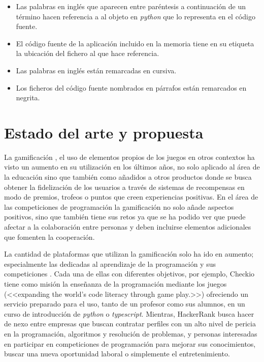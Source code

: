 \documentclass[11pt,spanish,listoffigures,listoftables]{tfgetsinf}
\begin{document}
\begin{itemize}
	\item Las palabras en inglés que aparecen entre paréntesis a continuación de un término hacen referencia a al objeto en \textit{python} que lo representa en el código fuente.
	\item El código fuente de la aplicación incluido en la memoria tiene en su etiqueta la ubicación del fichero al que hace referencia.
	\item Las palabras en inglés están remarcadas en cursiva.
	\item Los ficheros del código fuente nombrados en párrafos están remarcados en negrita.
\end{itemize}

\chapter{Estado del arte y propuesta}

La gamificación \cite{article-defining-gamification}, el uso de elementos propios de los juegos en otros contextos ha visto un aumento en su utilización en los últimos años, no solo aplicado al área de la educación sino que también como añadidos a otros productos donde se busca obtener la fidelización de los  usuarios a través de sistemas de recompensas en modo de premios, trofeos o puntos que creen experiencias positivas. En el área de las competiciones de programación la gamificación no solo añade aspectos positivos, sino que también tiene sus retos ya que se ha podido ver que puede afectar a la colaboración entre personas \cite{article-improving-collaborative} y deben incluirse elementos adicionales que fomenten la cooperación.

La cantidad de plataformas que utilizan la gamificación solo ha ido en aumento; especialmente las dedicadas al aprendizaje de la programación y sus competiciones \cite{article-programing-competition-platforms}. Cada una de ellas con diferentes objetivos, por ejemplo, Checkio tiene como misión la enseñanza de la programación mediante los juegos (<<expanding the world’s code literacy through game play.>>) ofreciendo un servicio preparado para el uso, tanto de un profesor como sus alumnos, en un curso de introducción de \textit{python} o \textit{typescript}. Mientras, HackerRank busca hacer de nexo entre empresas que buscan contratar perfiles con un alto nivel de pericia en la programación, algoritmos y resolución de problemas, y personas interesadas en participar en competiciones de programación para mejorar sus conocimientos, buscar una nueva oportunidad laboral o simplemente el entretenimiento.
\end{document}
